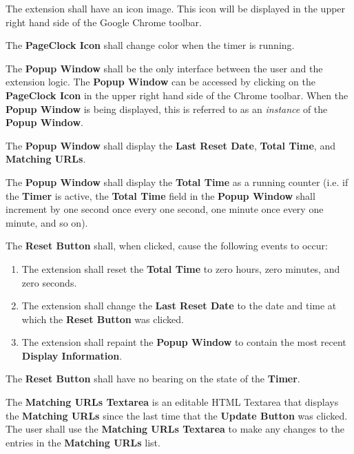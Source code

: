 \documentclass{designdoc}
\begin{document}
The extension shall have an icon image. This icon will be displayed in the
upper right hand side of the Google Chrome toolbar.

The \textbf{PageClock Icon} shall change color when the timer is running.

The \textbf{Popup Window} shall be the only interface between the user and the
extension logic. The \textbf{Popup Window} can be accessed by clicking on the
\textbf{PageClock Icon} in the upper right hand side of the Chrome toolbar.
When the \textbf{Popup Window} is being displayed, this is referred to as an
\textit{instance} of the \textbf{Popup Window}.

The \textbf{Popup Window} shall display the \textbf{Last Reset Date},
\textbf{Total Time}, and \textbf{Matching URLs}.

The \textbf{Popup Window} shall display the \textbf{Total Time} as a running
counter (i.e. if the \textbf{Timer} is active, the \textbf{Total Time} field in
the \textbf{Popup Window} shall increment by one second once every one second,
one minute once every one minute, and so on).

The \textbf{Reset Button} shall, when clicked, cause the following events to
occur:
\begin{enumerate}
\item The extension shall reset the \textbf{Total Time} to zero hours, zero
  minutes, and zero seconds.
\item The extension shall change the \textbf{Last Reset Date} to the date and
  time at which the \textbf{Reset Button} was clicked.
\item The extension shall repaint the \textbf{Popup Window} to contain the most
  recent \textbf{Display Information}.
\end{enumerate}
The \textbf{Reset Button} shall have no bearing on the state of the
\textbf{Timer}.

The \textbf{Matching URLs Textarea} is an editable HTML Textarea that displays
the \textbf{Matching URLs} since the last time that the \textbf{Update Button}
was clicked. The user shall use the \textbf{Matching URLs Textarea} to make any
changes to the entries in the \textbf{Matching URLs} list.
\end{document}
